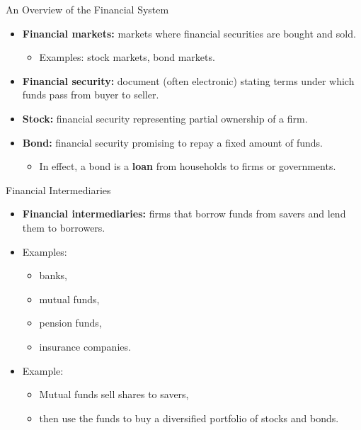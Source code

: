 \documentclass[aspectratio=169]{beamer}
\begin{document}

\begin{frame}{An Overview of the Financial System}
\transfade
\begin{itemize}[<+->]
  \item \textbf{Financial markets:} markets where financial securities are bought and sold.
  \begin{itemize}[<+->]
    \item Examples: stock markets, bond markets.
  \end{itemize}
  \item \textbf{Financial security:} document (often electronic) stating terms under which funds pass from buyer to seller.
  \item \textbf{Stock:} financial security representing partial ownership of a firm.
  \item \textbf{Bond:} financial security promising to repay a fixed amount of funds.
  \begin{itemize}[<+->]
    \item In effect, a bond is a \textbf{loan} from households to firms or governments.
  \end{itemize}
\end{itemize}
\end{frame}

\begin{frame}{Financial Intermediaries}
\transfade
\begin{itemize}[<+->]
  \item \textbf{Financial intermediaries:} firms that borrow funds from savers and lend them to borrowers.
  \item Examples:
  \begin{itemize}[<+->]
    \item banks,
    \item mutual funds,
    \item pension funds,
    \item insurance companies.
  \end{itemize}
  \item Example:
  \begin{itemize}[<+->]
    \item Mutual funds sell shares to savers,
    \item then use the funds to buy a diversified portfolio of stocks and bonds.
  \end{itemize}
\end{itemize}
\end{frame}
\end{document}
